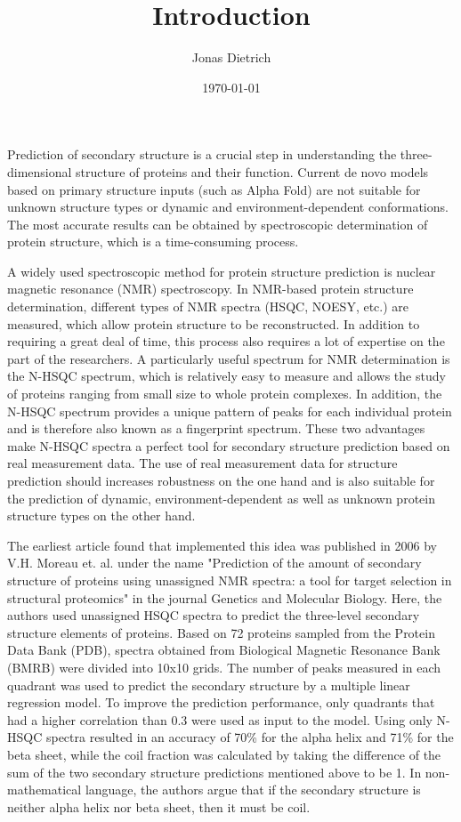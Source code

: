 \documentclass[11pt]{article}
\author{Jonas Dietrich}
\date{\today}
\title{Introduction}
\begin{document}
\maketitle
Prediction of secondary structure is a crucial step in understanding the three-dimensional structure of proteins and their function.
Current de novo models based on primary structure inputs (such as Alpha Fold) are not suitable for unknown structure types or dynamic and environment-dependent conformations.
The most accurate results can be obtained by spectroscopic determination of protein structure, which is a time-consuming process.

A widely used spectroscopic method for protein structure prediction is nuclear magnetic resonance (NMR) spectroscopy.
In NMR-based protein structure determination, different types of NMR spectra (HSQC, NOESY, etc.) are measured, which allow protein structure to be reconstructed.
In addition to requiring a great deal of time, this process also requires a lot of expertise on the part of the researchers.
A particularly useful spectrum for NMR determination is the N-HSQC spectrum, which is relatively easy to measure and allows the study of proteins ranging from small size to whole protein complexes.
In addition, the N-HSQC spectrum provides a unique pattern of peaks for each individual protein and is therefore also known as a fingerprint spectrum.
These two advantages make N-HSQC spectra a perfect tool for secondary structure prediction based on real measurement data.
The use of real measurement data for structure prediction should increases robustness on the one hand and is also suitable for the prediction of dynamic, environment-dependent as well as unknown protein structure types on the other hand.

The earliest article found that implemented this idea was published in 2006 by V.H. Moreau et. al. under the name "Prediction of the amount of secondary structure of proteins using unassigned NMR spectra: a tool for target selection in structural proteomics" in the journal Genetics and Molecular Biology.
Here, the authors used unassigned HSQC spectra to predict the three-level secondary structure elements of proteins.
Based on 72 proteins sampled from the Protein Data Bank (PDB), spectra obtained from Biological Magnetic Resonance Bank (BMRB) were divided into 10x10 grids.
The number of peaks measured in each quadrant was used to predict the secondary structure by a multiple linear regression model.
To improve the prediction performance, only quadrants that had a higher correlation than 0.3 were used as input to the model.
Using only N-HSQC spectra resulted in an accuracy of 70\% for the alpha helix and 71\% for the beta sheet, while the coil fraction was calculated by taking the difference of the sum of the two secondary structure predictions mentioned above to be 1.
In non-mathematical language, the authors argue that if the secondary structure is neither alpha helix nor beta sheet, then it must be coil.
\end{document}
